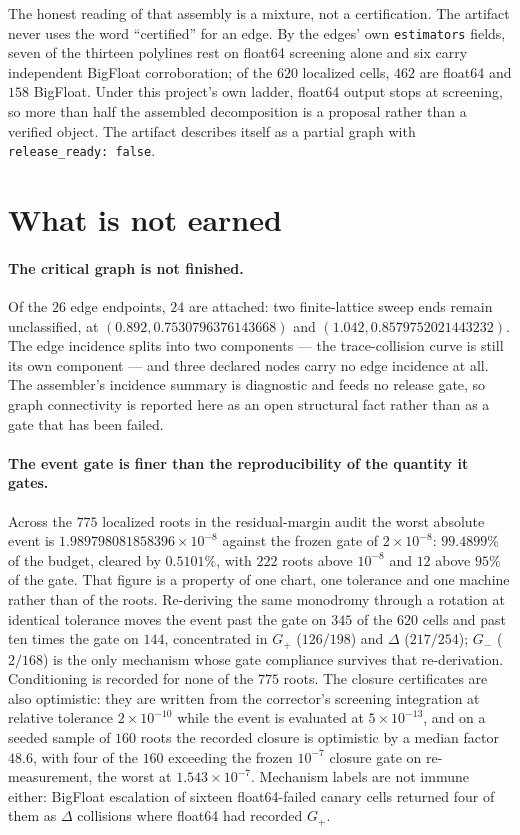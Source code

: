 \documentclass[11pt]{article}
\begin{document}
The honest reading of that assembly is a mixture, not a certification. The artifact never uses the
word ``certified'' for an edge. By the edges' own \texttt{estimators} fields, seven of the thirteen
polylines rest on float64 screening alone and six carry independent BigFloat corroboration; of the
$620$ localized cells, $462$ are float64 and $158$ BigFloat. Under this project's own ladder,
float64 output stops at screening, so more than half the assembled decomposition is a proposal
rather than a verified object. The artifact describes itself as a partial graph with
\texttt{release\_ready: false}.

\section{What is not earned}

\paragraph{The critical graph is not finished.} Of the $26$ edge endpoints, $24$ are attached: two
finite-lattice sweep ends remain unclassified, at $(0.892,0.7530796376143668)$ and
$(1.042,0.8579752021443232)$. The edge incidence splits into two components --- the trace-collision
curve is still its own component --- and three declared nodes carry no edge incidence at all. The
assembler's incidence summary is diagnostic and feeds no release gate, so graph connectivity is
reported here as an open structural fact rather than as a gate that has been failed.

\paragraph{The event gate is finer than the reproducibility of the quantity it gates.} Across the
$775$ localized roots in the residual-margin audit the worst absolute event is
$1.989798081858396\times10^{-8}$ against the frozen gate of $2\times10^{-8}$: $99.4899\%$ of the
budget, cleared by $0.5101\%$, with $222$ roots above $10^{-8}$ and $12$ above $95\%$ of the gate.
That figure is a property of one chart, one tolerance and one machine rather than of the roots.
Re-deriving the same monodromy through a rotation at identical tolerance moves the event past the
gate on $345$ of the $620$ cells and past ten times the gate on $144$, concentrated in $G_+$
($126/198$) and $\Delta$ ($217/254$); $G_-$ ($2/168$) is the only mechanism whose gate compliance
survives that re-derivation. Conditioning is recorded for none of the $775$ roots. The closure
certificates are also optimistic: they are written from the corrector's screening integration at
relative tolerance $2\times10^{-10}$ while the event is evaluated at $5\times10^{-13}$, and on a
seeded sample of $160$ roots the recorded closure is optimistic by a median factor $48.6$, with four
of the $160$ exceeding the frozen $10^{-7}$ closure gate on re-measurement, the worst at
$1.543\times10^{-7}$. Mechanism labels are not immune either: BigFloat escalation of sixteen
float64-failed canary cells returned four of them as $\Delta$ collisions where float64 had recorded
$G_+$.
\end{document}
